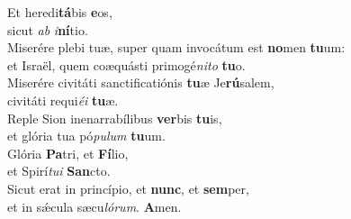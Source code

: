 \oddverse Et heredi\textbf{tá}bis \textbf{e}os,~\*\\
\oddverse sicut \textit{ab} \textit{i}\textbf{ní}tio.\\
\evenverse Miserére plebi tuæ, super quam invocátum est \textbf{no}men \textbf{tu}um:~\*\\
\evenverse et Israël, quem coæquásti primogé\textit{ni}\textit{to} \textbf{tu}o.\\
\oddverse Miserére civitáti sanctificatiónis \textbf{tu}æ Je\textbf{rú}salem,~\*\\
\oddverse civitáti requi\textit{é}\textit{i} \textbf{tu}æ.\\
\evenverse Reple Sion inenarrabílibus \textbf{ver}bis \textbf{tu}is,~\*\\
\evenverse et glória tua pó\textit{pu}\textit{lum} \textbf{tu}um.\\
\oddverse Glória \textbf{Pa}tri, et \textbf{Fí}lio,~\*\\
\oddverse et Spirí\textit{tu}\textit{i} \textbf{San}cto.\\
\evenverse Sicut erat in princípio, et \textbf{nunc}, et \textbf{sem}per,~\*\\
\evenverse et in sǽcula sæcu\textit{ló}\textit{rum}. \textbf{A}men.\\
